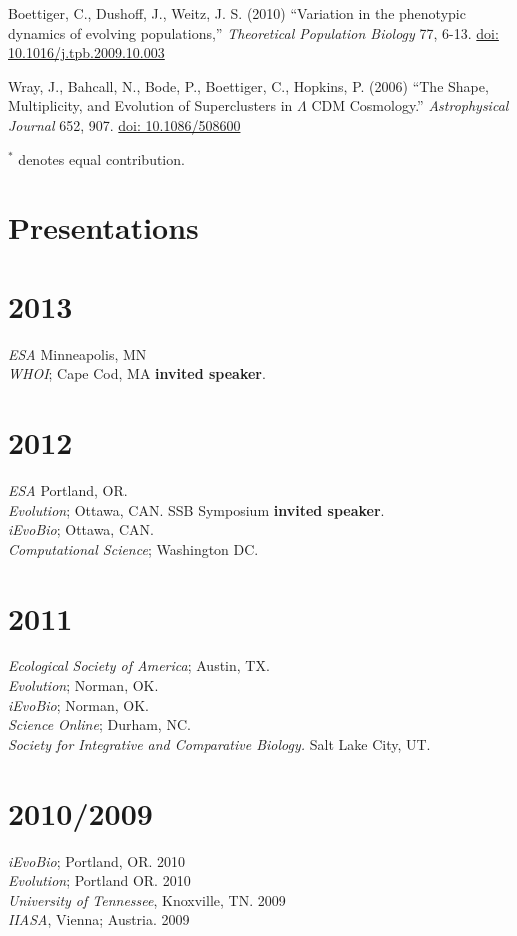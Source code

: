 \documentclass[margin]{res}
\begin{document}
\begin{resume}
\begin{etaremune}[start = 11]
\item Boettiger, C., Dushoff, J., Weitz, J. S. (2010) ``Variation in the phenotypic dynamics of evolving populations,'' {\it Theoretical Population Biology} 77, 6-13. \href{http://dx.doi.org/10.1016/j.tpb.2009.10.003}{doi: 10.1016/j.tpb.2009.10.003}
\item Wray, J., Bahcall, N., Bode, P., Boettiger, C., Hopkins, P.  (2006)  ``The Shape, Multiplicity, and Evolution of Superclusters in $\Lambda$ CDM Cosmology.''  {\it Astrophysical Journal} 652, 907. \href{http://dx.doi.org/10.1086/508600}{doi: 10.1086/508600}
\end{etaremune}
{ \footnotesize $^*$ denotes equal contribution.}

\section{Presentations} 
\section{\textnormal{2013}}
  \emph{ESA} Minneapolis, MN \\ 
  \emph{WHOI}; Cape Cod, MA \textbf{invited speaker}.\\
\section{\textnormal{2012}}
  \emph{ESA} Portland, OR. \\ 
  \emph{Evolution}; Ottawa, CAN. SSB Symposium \textbf{invited speaker}.\\
  \emph{iEvoBio}; Ottawa, CAN. \\
  \emph{Computational Science}; Washington DC. 
\section{\textnormal{2011}}
  \emph{Ecological Society of America}; Austin, TX. \\
  \emph{Evolution}; Norman, OK. \\
  \emph{iEvoBio}; Norman, OK. \\
  \emph{Science Online}; Durham, NC.\\
  \emph{Society for Integrative and Comparative Biology.} Salt Lake City, UT. \\
 \section{\textnormal{2010/2009}}
  \emph{iEvoBio}; Portland, OR. 2010 \\
  \emph{Evolution}; Portland OR. 2010 \\
 \emph{University of Tennessee}, Knoxville, TN. 2009 \\
 \emph{IIASA}, Vienna; Austria. 2009



\end{resume}
\end{document}
